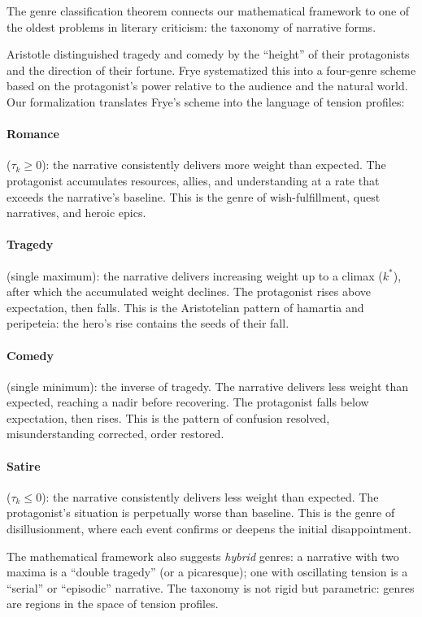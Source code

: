 \begin{interpretation}
\label{interp:genre-geometry}
The genre classification theorem connects our mathematical framework to one
of the oldest problems in literary criticism: the taxonomy of narrative forms.

Aristotle distinguished tragedy and comedy by the ``height'' of their
protagonists and the direction of their fortune.  Frye systematized this
into a four-genre scheme based on the protagonist's power relative to the
audience and the natural world.  Our formalization translates Frye's scheme
into the language of tension profiles:

\paragraph{Romance} ($\tau_k \geq 0$): the narrative consistently delivers
more weight than expected.  The protagonist accumulates resources, allies,
and understanding at a rate that exceeds the narrative's baseline.  This is
the genre of wish-fulfillment, quest narratives, and heroic epics.

\paragraph{Tragedy} (single maximum): the narrative delivers increasing weight
up to a climax ($k^*$), after which the accumulated weight declines.  The
protagonist rises above expectation, then falls.  This is the Aristotelian
pattern of hamartia and peripeteia: the hero's rise contains the seeds of
their fall.

\paragraph{Comedy} (single minimum): the inverse of tragedy.  The narrative
delivers less weight than expected, reaching a nadir before recovering.  The
protagonist falls below expectation, then rises.  This is the pattern of
confusion resolved, misunderstanding corrected, order restored.

\paragraph{Satire} ($\tau_k \leq 0$): the narrative consistently delivers
less weight than expected.  The protagonist's situation is perpetually
worse than baseline.  This is the genre of disillusionment, where each event
confirms or deepens the initial disappointment.

The mathematical framework also suggests \emph{hybrid} genres: a narrative
with two maxima is a ``double tragedy'' (or a picaresque); one with oscillating
tension is a ``serial'' or ``episodic'' narrative.  The taxonomy is not rigid
but parametric: genres are regions in the space of tension profiles.
\end{interpretation}


